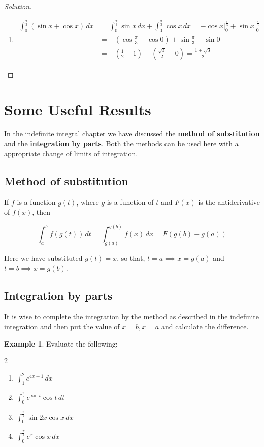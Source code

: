 \documentclass{book}
\theoremstyle{definition}
\newtheorem{example}{Example}[section]
\newenvironment{solution}
    {\begin{proof}[Solution]}
    {\end{proof}}
\begin{document}
\begin{solution}
\begin{enumerate}[label=(\roman*)]
\item 
\begin{align*}
\int_{0}^{\frac{\pi}{3}} (\sin x+\cos x)\,dx &= \int_{0}^{\frac{\pi}{3}} \sin x\,dx + \int_{0}^{\frac{\pi}{3}}\cos x\,dx = -\left.\cos x\right\vert_{0}^{\frac{\pi}{3}}+\left.\sin x\right\vert_{0}^{\frac{\pi}{3}} \\
&= -\left(\cos \frac{\pi}{3}-\cos 0\right)+\sin\frac{\pi}{3}-\sin 0 \\
&= -\left(\frac{1}{2}-1\right)+\left(\frac{\sqrt{3}}{2}-0\right) = \frac{1+\sqrt{3}}{2}
\end{align*}

\end{enumerate}
\end{solution}

\section {Some Useful Results} 

In the indefinite integral chapter we have discussed the \textbf{method of substitution} and the \textbf{integration by parts}. Both the methods can be used here with a appropriate change of limits of integration.

\subsection{Method of substitution}
If $f$ is a function $g(t)$, where $g$ is a function of $t$ and $F(x)$ is the antiderivative of $f(x)$, then

\[
\int _a^b f(g(t))\,dt=\int_{g(a)}^{g(b)}f(x)\,dx=F(g(b)-g(a))
\]

Here we have substituted $g(t)=x$, so that, $t=a \implies x=g(a)$ and $t=b \implies x=g(b)$.

\subsection{Integration by parts}
It is wise to complete the integration by the method as described in the indefinite integration and then put the value of $x=b, x=a$ and calculate the difference.

\begin{example}
Evaluate the following:
\begin{multicols}{2}
\begin{enumerate}[label=(\roman*)]
    \item $\displaystyle\int _{1}^{2}e^{4x+1} \, dx$
    \item $\displaystyle\int_{0}^{\frac{\pi}{2}}e^{\sin t}\cos t\,dt$
    \item $\displaystyle\int_{0}^{\frac{\pi}{4}} \sin 2x\cos x\,dx$
    \item $\displaystyle\int_{0}^{\frac{\pi}{4}} e^x\cos x\,dx$

\end{enumerate}
\end{multicols}    
\end{example}
\end{document}
